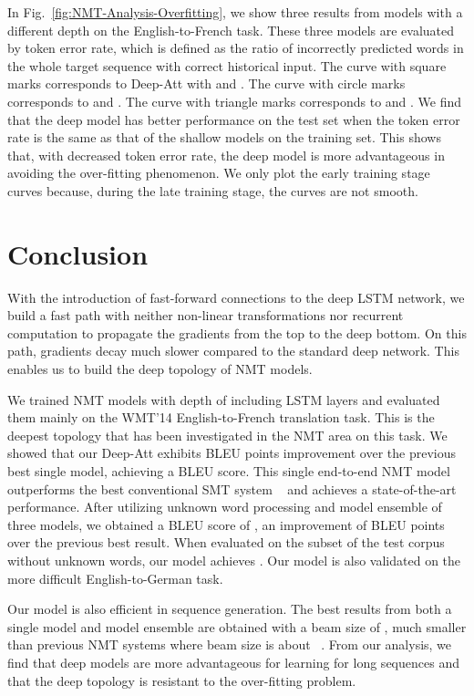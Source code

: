 \documentclass[11pt,letterpaper]{article}
\begin{document}
In Fig.~\ref{fig:NMT-Analysis-Overfitting}, we show three results from models with a different depth on the English-to-French task. These
three models are evaluated by token error rate, which is defined as the ratio of incorrectly predicted words in the whole target sequence with
correct historical    input.  The curve with square marks corresponds to Deep-Att with  and  . The curve with circle marks
corresponds to  and . The curve with triangle marks corresponds to  and .  We find that the deep model has better
performance on the test set when the token error rate is the same as that of the shallow models on the training set.  This shows that, with
decreased token error rate, the deep model is more advantageous in avoiding the over-fitting phenomenon. We only plot the early training stage
curves because, during the late training stage, the curves are not smooth.


\section{Conclusion}

With the introduction of fast-forward  connections to the deep \mbox{LSTM} network, we build a fast path with neither non-linear
transformations nor recurrent computation to propagate the gradients from the top to the deep bottom. On this path, gradients decay much
slower compared to the  standard deep network. This enables us to build the deep topology of NMT models.


We trained NMT models with depth of  including  LSTM layers and evaluated them mainly on the WMT'14 English-to-French translation
task. This is the deepest topology that has been investigated in the NMT area on this task. We showed that our Deep-Att exhibits  BLEU
points \mbox{improvement} over the previous best single model, achieving a  BLEU score. This single end-to-end NMT model outperforms the
best conventional SMT system ~\mbox{\cite{Durrani-Heafield-WMT2014}} and achieves a state-of-the-art performance. After utilizing  unknown
word processing and model ensemble of three models, we obtained a BLEU score  of , an improvement of   BLEU points over the
previous best result. When evaluated on the subset of the test corpus without unknown words, our model achieves . Our model is also
validated on the more difficult English-to-German task.

Our model is also efficient in sequence generation. The best results from both a single model and model ensemble are obtained with a beam size
of , much smaller than previous NMT systems where beam size is about  ~\cite{Jean-Bengio-ACL2015,Sutskever-Le-NIPS2014}.   From our
analysis, we find that deep \mbox{models} are more advantageous for learning for long sequences and that the deep topology is resistant to the
over-fitting problem.
\end{document}
